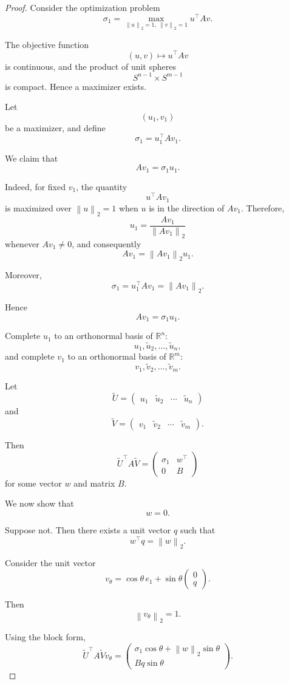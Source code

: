 \documentclass[12pt,oneside]{book}
\numberwithin{equation}{section}
\theoremstyle{definition}
\theoremstyle{plain}
\theoremstyle{remark}
\newcommand{\R}{\mathbb{R}}
\newcommand{\norm}[1]{\left\lVert #1 \right\rVert}
\begin{document}
\begin{proof}
Consider the optimization problem
\[
\sigma_1
=
\max_{\norm{u}_2=1,\ \norm{v}_2=1}
u^\top A v.
\]

The objective function
\[
(u,v)\mapsto u^\top A v
\]
is continuous, and the product of unit spheres
\[
S^{n-1}\times S^{m-1}
\]
is compact. Hence a maximizer exists.

Let
\[
(u_1,v_1)
\]
be a maximizer, and define
\[
\sigma_1=u_1^\top A v_1.
\]

We claim that
\[
Av_1=\sigma_1u_1.
\]

Indeed, for fixed $v_1$, the quantity
\[
u^\top A v_1
\]
is maximized over $\norm{u}_2=1$ when $u$ is in the direction of $Av_1$. Therefore,
\[
u_1=\frac{Av_1}{\norm{Av_1}_2}
\]
whenever $Av_1\neq0$, and consequently
\[
Av_1=\norm{Av_1}_2u_1.
\]

Moreover,
\[
\sigma_1
=
u_1^\top Av_1
=
\norm{Av_1}_2.
\]

Hence
\[
Av_1=\sigma_1u_1.
\]

Complete $u_1$ to an orthonormal basis of $\R^n$:
\[
u_1,\widetilde{u}_2,\dots,\widetilde{u}_n,
\]
and complete $v_1$ to an orthonormal basis of $\R^m$:
\[
v_1,\widetilde{v}_2,\dots,\widetilde{v}_m.
\]

Let
\[
\widetilde{U}
=
\begin{pmatrix}
u_1 & \widetilde{u}_2 & \cdots & \widetilde{u}_n
\end{pmatrix}
\]
and
\[
\widetilde{V}
=
\begin{pmatrix}
v_1 & \widetilde{v}_2 & \cdots & \widetilde{v}_m
\end{pmatrix}.
\]

Then
\[
\widetilde{U}^\top A\widetilde{V}
=
\begin{pmatrix}
\sigma_1 & w^\top \\
0 & B
\end{pmatrix}
\]
for some vector $w$ and matrix $B$.

We now show that
\[
w=0.
\]

Suppose not. Then there exists a unit vector $q$ such that
\[
w^\top q=\norm{w}_2.
\]

Consider the unit vector
\[
v_\theta
=
\cos\theta\, e_1+\sin\theta
\begin{pmatrix}
0\\
q
\end{pmatrix}.
\]

Then
\[
\norm{v_\theta}_2=1.
\]

Using the block form,
\[
\widetilde{U}^\top A\widetilde{V}v_\theta
=
\begin{pmatrix}
\sigma_1\cos\theta+\norm{w}_2\sin\theta\\
Bq\sin\theta
\end{pmatrix}.
\]


\end{proof}
\end{document}
